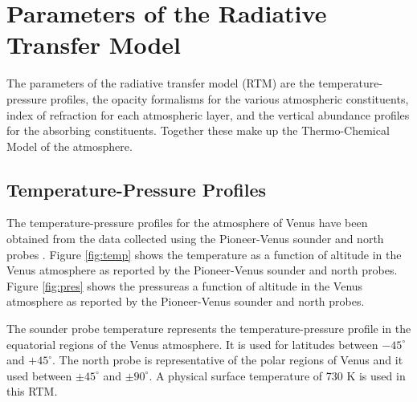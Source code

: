 \section{Parameters of the Radiative Transfer Model}
The parameters of the radiative transfer model (RTM) are the temperature-pressure profiles, the opacity formalisms for the various atmospheric constituents, index of refraction for each atmospheric layer, and the vertical abundance profiles for the absorbing constituents. Together these make up the Thermo-Chemical Model of the atmosphere.
\subsection{Temperature-Pressure Profiles}
The temperature-pressure profiles for the atmosphere of Venus have been obtained from the data collected using the Pioneer-Venus sounder and north probes \cite{Seiff-1980}. Figure \ref{fig:temp} shows the temperature as a function of altitude in the Venus atmosphere as reported by the Pioneer-Venus sounder and north probes. Figure \ref{fig:pres} shows the pressureas a function of altitude in the Venus atmosphere as reported by the Pioneer-Venus sounder and north probes.

The sounder probe temperature represents the temperature-pressure profile in the equatorial regions of the Venus atmosphere. It is used for latitudes between $-45^\circ$ and $+45^\circ$. The north probe is representative of the polar regions of Venus and it used between $\pm 45^\circ$ and $\pm90^\circ$. A physical surface temperature of 730 K is used in this RTM.

